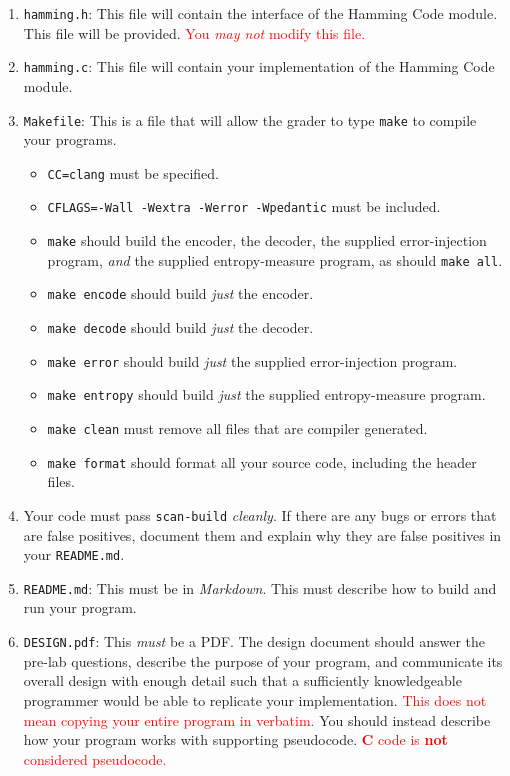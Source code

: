 \documentclass[11pt]{article}
\begin{document}
\begin{enumerate}
  \item \texttt{hamming.h}: This file will contain the interface of the
    Hamming Code module. This file will be provided. \textcolor{red}{You
    \emph{may not} modify this file.}

  \item \texttt{hamming.c}: This file will contain your implementation of the
    Hamming Code module.

  \item \texttt{Makefile}: This is a file that will allow the grader to
    type \texttt{make} to compile your programs.

    \begin{itemize}
      \item \texttt{CC=clang} must be specified.
      \item \texttt{CFLAGS=-Wall -Wextra -Werror -Wpedantic}
        must be included.
      \item \texttt{make} should build the encoder, the decoder, the
        supplied error-injection program, \emph{and} the supplied
        entropy-measure program, as should \texttt{make all}.
      \item \texttt{make encode} should build \emph{just} the encoder.
      \item \texttt{make decode} should build \emph{just} the decoder.
      \item \texttt{make error} should build \emph{just} the supplied
        error-injection program.
      \item \texttt{make entropy} should build \emph{just} the supplied
        entropy-measure program.
      \item \texttt{make clean} must remove all files that are compiler
        generated.
      \item \texttt{make format} should format all your source code,
        including the header files.
    \end{itemize}

  \item Your code must pass \texttt{scan-build} \emph{cleanly}. If there
    are any bugs or errors that are false positives, document them and
    explain why they are false positives in your \texttt{README.md}.

  \item \texttt{README.md}: This must be in \emph{Markdown}. This must describe
    how to build and run your program.

  \item \texttt{DESIGN.pdf}: This \emph{must} be a PDF\@. The design document
    should answer the pre-lab questions, describe the purpose of your program,
    and communicate its overall design with enough detail such that a sufficiently
    knowledgeable programmer would be able to replicate your implementation.
    \textcolor{red}{This does not mean copying your entire program in verbatim.}
    You should instead describe how your program works with supporting pseudocode.
    \textcolor{red}{\textbf{C} code is \textbf{not} considered pseudocode.}


\end{enumerate}
\end{document}

